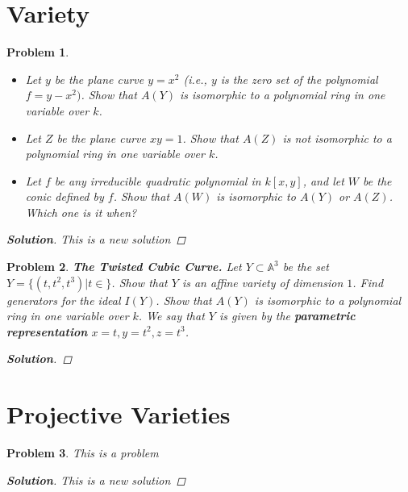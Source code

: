 \documentclass[11pt]{article}
\newtheorem{problem}{Problem}
\numberwithin{problem}{section}
\newenvironment{solution}
               {\let\oldqedsymbol=\qedsymbol
                \renewcommand{\qedsymbol}{$\blacktriangleleft$}
                \begin{proof}[\bfseries\upshape Solution]}
               {\end{proof}
                \renewcommand{\qedsymbol}{\oldqedsymbol}}
\begin{document}
\section{Variety}

\begin{problem}
\begin{itemize}
\item[(a)] Let $y$ be the plane curve $y = x^2$ (i.e., $y$ is the zero set of the polynomial $f = y - x^2)$. Show that $A(Y)$ is isomorphic to a polynomial ring in one variable over $k$.
\item[(b)] Let $Z$ be the plane curve $xy=1$. Show that $A(Z)$ is not isomorphic to a polynomial ring in one variable over $k$.
\item[(c)*] Let $f$ be any irreducible quadratic polynomial in $k[x,y]$, and let $W$ be the conic defined by $f$. Show that $A(W)$ is isomorphic to $A(Y)$ or $A(Z)$. Which one is it when?
\end{itemize}
\begin{solution}
This is a new solution	
\end{solution}	
\end{problem}

\begin{problem}
\textbf{The Twisted Cubic Curve.} Let $Y\subset \mathbb{A}^3$ be the set $Y=\{(t,t^2,t^3)|t\in\}$. Show that $Y$ is an affine variety of dimension $1$. Find generators for the ideal $I(Y)$. Show that $A(Y)$ is isomorphic to a polynomial ring in one variable over $k$. We say that $Y$ is given by the \textbf{parametric representation} $x=t, y=t^2, z=t^3$.
\begin{solution}


\end{solution}
\end{problem}



\section{Projective Varieties}

\begin{problem}
This is a problem
\begin{solution}
This is a new solution	
\end{solution}	
\end{problem}
\end{document}
